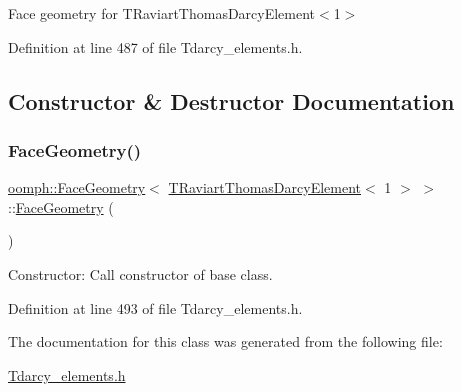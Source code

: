 Face geometry for T\+Raviart\+Thomas\+Darcy\+Element$<$1$>$ 

Definition at line 487 of file Tdarcy\+\_\+elements.\+h.



\subsection{Constructor \& Destructor Documentation}
\mbox{\label{classoomph_1_1FaceGeometry_3_01TRaviartThomasDarcyElement_3_011_01_4_01_4_a538cb774351bae21422d8d9d9bdd06f0}} 
\subsubsection{\texorpdfstring{Face\+Geometry()}{FaceGeometry()}}
{\footnotesize\ttfamily \hyperlink{classoomph_1_1FaceGeometry}{oomph\+::\+Face\+Geometry}$<$ \hyperlink{classoomph_1_1TRaviartThomasDarcyElement}{T\+Raviart\+Thomas\+Darcy\+Element}$<$ 1 $>$ $>$\+::\hyperlink{classoomph_1_1FaceGeometry}{Face\+Geometry} (\begin{DoxyParamCaption}{ }\end{DoxyParamCaption})\hspace{0.3cm}{\ttfamily [inline]}}



Constructor\+: Call constructor of base class. 



Definition at line 493 of file Tdarcy\+\_\+elements.\+h.



The documentation for this class was generated from the following file\+:\begin{DoxyCompactItemize}
\item 
\hyperlink{Tdarcy__elements_8h}{Tdarcy\+\_\+elements.\+h}\end{DoxyCompactItemize}
